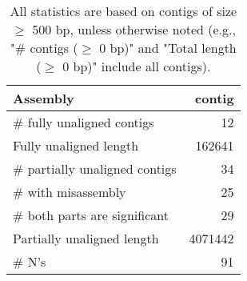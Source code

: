 \documentclass[12pt,a4paper]{article}
\begin{document}
\begin{table}[ht]
\begin{center}
\caption{All statistics are based on contigs of size $\geq$ 500 bp, unless otherwise noted (e.g., "\# contigs ($\geq$ 0 bp)" and "Total length ($\geq$ 0 bp)" include all contigs).}
\begin{tabular}{|l*{1}{|r}|}
\hline
Assembly & contig \\ \hline
\# fully unaligned contigs & 12 \\ \hline
Fully unaligned length & 162641 \\ \hline
\# partially unaligned contigs & 34 \\ \hline
\hspace{5mm}\# with misassembly & 25 \\ \hline
\hspace{5mm}\# both parts are significant & 29 \\ \hline
Partially unaligned length & 4071442 \\ \hline
\# N's & 91 \\ \hline
\end{tabular}
\end{center}
\end{table}
\end{document}
